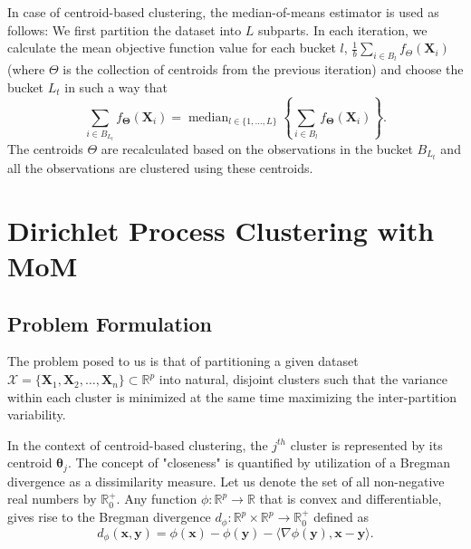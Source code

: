 \documentclass[12pt]{article}
\newcommand{\bX}{\boldsymbol{X}}
\newcommand{\bTheta}{\boldsymbol{\Theta}}
\begin{document}
In case of centroid-based clustering, the median-of-means estimator is used as follows: We first partition the dataset into $L$ subparts. In each iteration, we calculate the mean objective function value for each bucket $l$, $\frac{1}{b}\sum_{i \in B_{l}}f_{{\Theta}}(\bX_i)$ (where $\Theta$ is the collection of centroids from the previous iteration) and choose the bucket $L_t$ in such a way that
\begin{equation}\label{eq4}
    \sum_{i \in B_{L_t}}f_{{\bTheta}}(\bX_i)=\operatorname{median}_{l \in \{1,\ldots,L\}}\left\{\sum_{i \in B_{l}}f_{{\bTheta}}(\bX_i)\right\}.
\end{equation}
The centroids $\Theta$ are recalculated based on the observations in the bucket $B_{L_t}$ and all the observations are clustered using these centroids.

\section{Dirichlet Process Clustering with MoM}

\subsection{Problem Formulation}
The problem posed to us is that of partitioning a given dataset $\mathcal{X} = \{\bX_1, \bX_2, \ldots, \bX_n\}\subset \mathbb{R}^p$ into natural, disjoint clusters such that the variance within each cluster is minimized at the same time maximizing the inter-partition variability. 


In the context of centroid-based clustering, the $j^{th}$ cluster is represented by its centroid $\boldsymbol{\theta}_j$. The concept of "closeness" is quantified by utilization of a Bregman divergence \cite{BREGMAN1967200} as a dissimilarity measure. Let us denote the set of all non-negative real numbers by $\mathbb{R}^{+}_0$. Any function $\phi: \mathbb{R}^p \rightarrow \mathbb{R}$ that is convex and differentiable, gives rise to the Bregman divergence $d_\phi: \mathbb{R}^p \times \mathbb{R}^p \rightarrow \mathbb{R}^{+}_0$ defined as
\begin{equation}
    d_\phi(\boldsymbol{x}, \boldsymbol{y})=\phi(\boldsymbol{x})-\phi(\boldsymbol{y})-\langle\nabla \phi(\boldsymbol{y}), \boldsymbol{x}-\boldsymbol{y}\rangle.
\end{equation}
\end{document}
